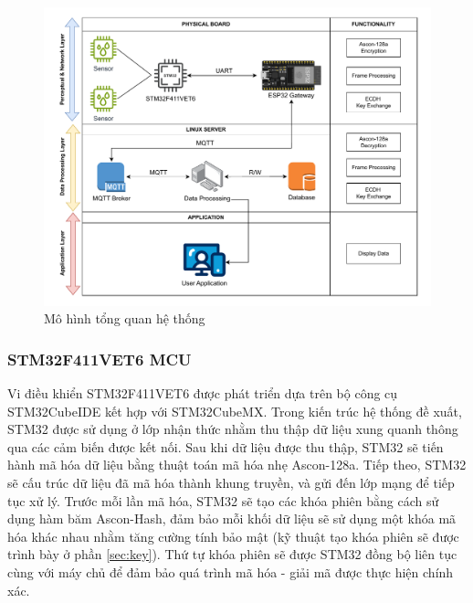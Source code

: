 \begin{figure}[h]
    \centering
    \includegraphics[width=1\linewidth]{realsystem.pdf}
    \caption{Mô hình tổng quan hệ thống}
    \label{fig:realsystem}
\end{figure}

\subsubsection{STM32F411VET6 MCU}
Vi điều khiển STM32F411VET6 được phát triển dựa trên bộ công cụ STM32CubeIDE kết hợp với STM32CubeMX. Trong kiến trúc hệ thống đề xuất, STM32 được sử dụng ở lớp nhận thức nhằm thu thập dữ liệu xung quanh thông qua các cảm biến được kết nối. Sau khi dữ liệu được thu thập, STM32 sẽ tiến hành mã hóa dữ liệu bằng thuật toán mã hóa nhẹ Ascon-128a. Tiếp theo, STM32 sẽ cấu trúc dữ liệu đã mã hóa thành khung truyền, và gửi đến lớp mạng để tiếp tục xử lý. Trước mỗi lần mã hóa, STM32 sẽ tạo các khóa phiên bằng cách sử dụng hàm băm Ascon-Hash, đảm bảo mỗi khối dữ liệu sẽ sử dụng một khóa mã hóa khác nhau nhằm tăng cường tính bảo mật (kỹ thuật tạo khóa phiên sẽ được trình bày ở phần \ref{sec:key}). Thứ tự khóa phiên sẽ được STM32 đồng bộ liên tục cùng với máy chủ để đảm bảo quá trình mã hóa - giải mã được thực hiện chính xác.

